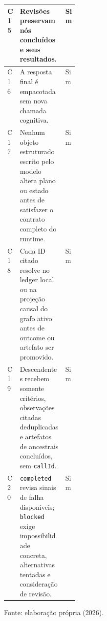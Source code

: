 \begin{table}[H]
\begin{tabularx}{\linewidth}{|p{0.07\linewidth}|Y|p{0.10\linewidth}|}
\hline
C15 & Revisões preservam nós concluídos e seus resultados. & Sim \\
\hline
C16 & A resposta final é empacotada sem nova chamada cognitiva. & Sim \\
\hline
C17 & Nenhum objeto estruturado escrito pelo modelo altera plano ou estado antes de satisfazer o contrato completo do runtime. & Sim \\
\hline
C18 & Cada ID citado resolve no ledger local ou na projeção causal do grafo ativo antes de outcome ou artefato ser promovido. & Sim \\
\hline
C19 & Descendentes recebem somente critérios, observações citadas deduplicadas e artefatos de ancestrais concluídos, sem \texttt{callId}. & Sim \\
\hline
C20 & \texttt{completed} revisa sinais de falha disponíveis; \texttt{blocked} exige impossibilidade concreta, alternativas tentadas e consideração de revisão. & Sim \\
\hline
\end{tabularx}
\par\smallskip\raggedright\small Fonte: elaboração própria (2026).
\end{table}
